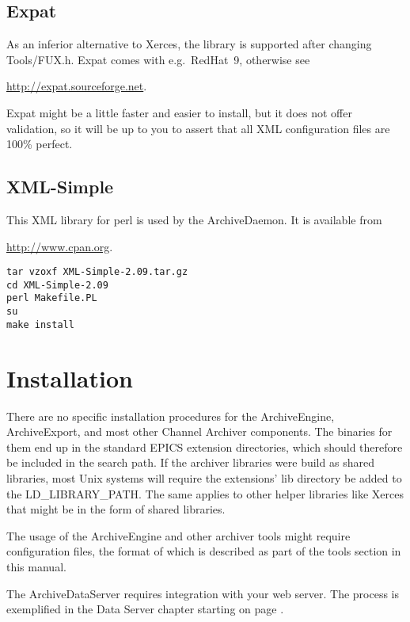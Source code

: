 \subsection{Expat}
As an inferior alternative to Xerces, the  library is supported
after changing Tools/FUX.h. Expat comes with e.g.\ RedHat~9,
otherwise see
\begin{center}
\href{http://expat.sourceforge.net}{http://expat.sourceforge.net}.
\end{center}
Expat might be a little faster and easier to install, but it does not
offer validation, so it will be up to you to assert that all XML
configuration files are 100\% perfect.

\subsection{XML-Simple}
This XML library for perl is used by the ArchiveDaemon.
It is available from 
\begin{center}
\href{http://www.cpan.org}{http://www.cpan.org}.
\end{center}
\begin{lstlisting}[keywordstyle=\sffamily]
tar vzoxf XML-Simple-2.09.tar.gz
cd XML-Simple-2.09
perl Makefile.PL
su
make install
\end{lstlisting}

\section{Installation}
There are no specific installation procedures for the ArchiveEngine,
ArchiveExport, and most other Channel Archiver components. The
binaries for them end up in the standard EPICS extension directories,
which should therefore be included in the search path. If the archiver
libraries were build as shared libraries, most Unix systems will
require the extensions' lib directory be added to the
LD\_LIBRARY\_PATH. The same applies to other helper libraries like
Xerces that might be in the form of shared libraries.

The usage of the ArchiveEngine and other archiver tools might require
configuration files, the format of which is described as part of the
tools section in this manual.

The ArchiveDataServer requires integration with your web server. The
process is exemplified in the Data Server chapter starting on page
\pageref{sec:dataserver}.

